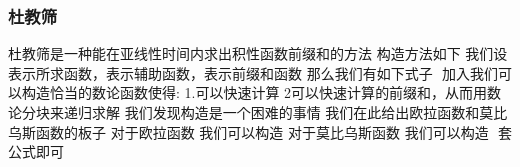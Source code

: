 \documentclass[8pt,a4paper]{article}
\newcommand{\code}[1]{
    
}
\newcommand{\txt}[1]{\par\noindent\footnotesize #1}
\newcommand{\inlineformula}[1]{\ensuremath{}}
\begin{document}
\begin{multicols}{2}
        \subsubsection{杜教筛}
            \txt{杜教筛是一种能在亚线性时间内求出积性函数前缀和的方法
构造方法如下
我们设\inlineformula{./assets/formulas_tex/formula_161.tex}表示所求函数，\inlineformula{./assets/formulas_tex/formula_162.tex}表示辅助函数，\inlineformula{./assets/formulas_tex/formula_163.tex}表示前缀和函数
那么我们有如下式子
\inlineformula{./assets/formulas_tex/formula_164.tex}
加入我们可以构造恰当的数论函数\inlineformula{./assets/formulas_tex/formula_165.tex}使得:
1.可以快速计算\inlineformula{./assets/formulas_tex/formula_166.tex}
2可以快速计算\inlineformula{./assets/formulas_tex/formula_167.tex}的前缀和，从而用数论分块来递归求解\inlineformula{./assets/formulas_tex/formula_168.tex}
我们发现构造是一个困难的事情 我们在此给出欧拉函数和莫比乌斯函数的板子
对于欧拉函数 我们可以构造\inlineformula{./assets/formulas_tex/formula_169.tex}
对于莫比乌斯函数 我们可以构造 \inlineformula{./assets/formulas_tex/formula_170.tex}
套公式即可}
            \code{src/number_theory/数论定理_16_5.cpp}

\end{multicols}
\end{document}
